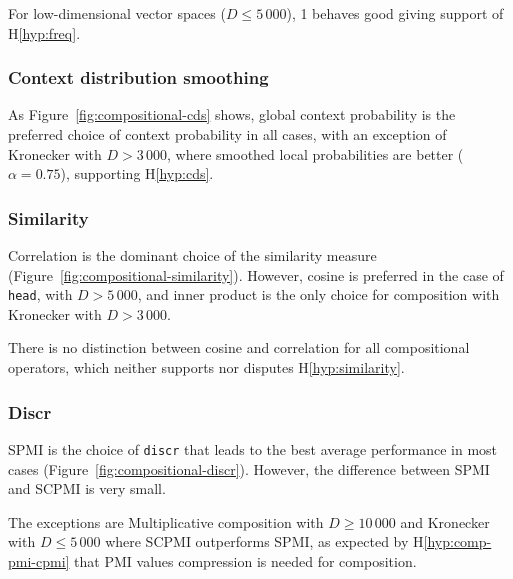 For low-dimensional vector spaces ($D \leq 5\,000$), 1 behaves good giving support of H\ref{hyp:freq}.
%
%

\subsubsection{Context distribution smoothing}
\label{sec:cont-distr-smooth-compositional}



As Figure~\ref{fig:compositional-cds} shows, global context probability is the preferred choice of context probability in all cases, with an exception of Kronecker with $D > 3\,000$, where smoothed local probabilities are better ($\alpha = 0.75$), supporting H\ref{hyp:cds}.

\subsubsection{Similarity}
\label{sec:similarity-compositional}

Correlation is the dominant choice of the similarity measure (Figure~\ref{fig:compositional-similarity}). However, cosine is preferred in the case of \texttt{head}, with $D > 5\,000$, and inner product is the only choice for composition with Kronecker with $D > 3\,000$.

There is no distinction between cosine and correlation for all compositional operators, which neither supports nor disputes H\ref{hyp:similarity}.
%
%

\subsubsection{Discr}
\label{sec:discr-compositional}



SPMI is the choice of \texttt{discr} that leads to the best average performance in most cases (Figure~\ref{fig:compositional-discr}). However, the difference between SPMI and SCPMI is very small.

The exceptions are Multiplicative composition with $D \geq 10\,000$ and Kronecker with $D \leq 5\,000$ where SCPMI outperforms SPMI, as expected by H\ref{hyp:comp-pmi-cpmi} that PMI values compression is needed for composition.

